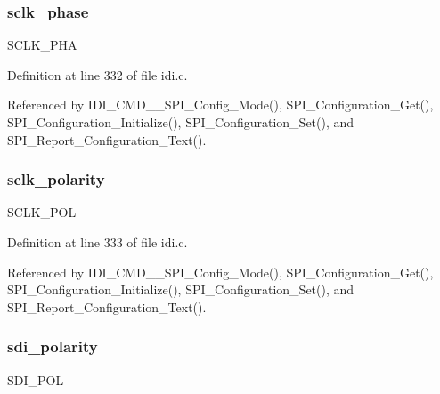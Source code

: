 \hypertarget{structspi__cfg_a2613a037b4632a6d74e89aeb62d12344}{
\subsubsection[{sclk\+\_\+phase}]{ sclk\+\_\+phase}}\label{structspi__cfg_a2613a037b4632a6d74e89aeb62d12344}
S\+C\+L\+K\+\_\+\+P\+H\+A 

Definition at line 332 of file idi.\+c.



Referenced by I\+D\+I\+\_\+\+C\+M\+D\+\_\+\+\_\+\+S\+P\+I\+\_\+\+Config\+\_\+\+Mode(), S\+P\+I\+\_\+\+Configuration\+\_\+\+Get(), S\+P\+I\+\_\+\+Configuration\+\_\+\+Initialize(), S\+P\+I\+\_\+\+Configuration\+\_\+\+Set(), and S\+P\+I\+\_\+\+Report\+\_\+\+Configuration\+\_\+\+Text().

\hypertarget{structspi__cfg_a08a45f7aec9d8b6e59e91a56dc889384}{
\subsubsection[{sclk\+\_\+polarity}]{ sclk\+\_\+polarity}}\label{structspi__cfg_a08a45f7aec9d8b6e59e91a56dc889384}
S\+C\+L\+K\+\_\+\+P\+O\+L 

Definition at line 333 of file idi.\+c.



Referenced by I\+D\+I\+\_\+\+C\+M\+D\+\_\+\+\_\+\+S\+P\+I\+\_\+\+Config\+\_\+\+Mode(), S\+P\+I\+\_\+\+Configuration\+\_\+\+Get(), S\+P\+I\+\_\+\+Configuration\+\_\+\+Initialize(), S\+P\+I\+\_\+\+Configuration\+\_\+\+Set(), and S\+P\+I\+\_\+\+Report\+\_\+\+Configuration\+\_\+\+Text().

\hypertarget{structspi__cfg_a010045ad60dc510daa368259399de229}{
\subsubsection[{sdi\+\_\+polarity}]{ sdi\+\_\+polarity}}\label{structspi__cfg_a010045ad60dc510daa368259399de229}
S\+D\+I\+\_\+\+P\+O\+L 

